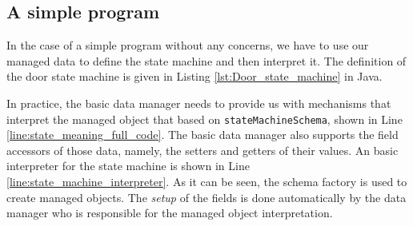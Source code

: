 \subsection{A simple program}
In the case of a simple program without any concerns, we have to use our managed data to define the state machine and then interpret it.
The definition of the door state machine is given in Listing \ref{lst:Door_state_machine} in Java.

In practice, the basic data manager needs to provide us with mechanisms that interpret the managed object that based on \texttt{stateMachineSchema}, shown in Line \ref{line:state_meaning_full_code}.
The basic data manager  also supports the field accessors of those data, namely, the setters and getters of their values.
An basic interpreter for the state machine is shown in Line \ref{line:state_machine_interpreter}.
As it can be seen, the schema factory is used to create managed objects.
The \textit{setup} of the fields is done automatically by the data manager who is responsible for the managed object interpretation.

